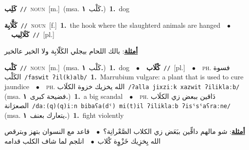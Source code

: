 \documentclass[10pt,a4paper,twoside]{article} %
\begin{document}
\begin{multicols}{2}
{\setlength\topsep{0pt}\textbf{\foreignlanguage{arabic}{كَلِب}}\ {\color{gray}\texttt{//}\color{black}}\ \textsc{noun}\ [m.]\ \color{gray}(msa. \foreignlanguage{arabic}{كَلْب}~\foreignlanguage{arabic}{\textbf{١.}})\color{black}\ \textbf{1.}~dog\ } \vspace{2mm}

{\setlength\topsep{0pt}\textbf{\foreignlanguage{arabic}{كَلَّابِة}}\ {\color{gray}\texttt{//}\color{black}}\ \textsc{noun}\ [f.]\ \textbf{1.}~the hook where the slaughterd animals are hanged\ \ $\bullet$\ \ \setlength\topsep{0pt}\textbf{\foreignlanguage{arabic}{كَلَالِيب}}\ {\color{gray}\texttt{//}\color{black}}\ [pl.]\  \begin{flushright}\color{gray}\foreignlanguage{arabic}{\textbf{\underline{\foreignlanguage{arabic}{أمثلة}}}: بالك اللحام بيجلي الكَلّابِة ولا الخير عالخير}\end{flushright}\color{black}} \vspace{2mm}

{\setlength\topsep{0pt}\textbf{\foreignlanguage{arabic}{كَلْب}}\ {\color{gray}\texttt{//}\color{black}}\ \textsc{noun}\ [m.]\ \color{gray}(msa. \foreignlanguage{arabic}{كَلْب}~\foreignlanguage{arabic}{\textbf{١.}})\color{black}\ \textbf{1.}~dog\ \ $\bullet$\ \ \setlength\topsep{0pt}\textbf{\foreignlanguage{arabic}{كْلَاب}}\ {\color{gray}\texttt{//}\color{black}}\ [pl.]\ \ $\bullet$\ \ \textsc{ph.} \color{gray} \foreignlanguage{arabic}{فسوة الكَلْب}\color{black}\ {\color{gray}\texttt{/{\sffamily faswit ʔil(k)alb}/}\color{black}}\ \textbf{1.}~Marrubium vulgare: a plant that is used to cure jaundice\ \ $\bullet$\ \ \textsc{ph.} \color{gray} \foreignlanguage{arabic}{الله يخزيك خزوة الكلَاب}\color{black}\ {\color{gray}\texttt{/{\sffamily ʔalla jixziːk xazwit ʔiliklaːb}/}\color{black}}\ \color{gray} (msa. \foreignlanguage{arabic}{فضيحة كبرى}~\foreignlanguage{arabic}{\textbf{١.}})\color{black}\ \textbf{1.}~a big scandal\ \ $\bullet$\ \ \textsc{ph.} \color{gray} \foreignlanguage{arabic}{دَاقين ببعض زي الكلَاب الصعرَانة}\color{black}\ {\color{gray}\texttt{/{\sffamily daː(q)(q)iːn bibaʕa(dˤ) mi(t)il ʔiliklaːb ʔisˤsˤaʕraːne}/}\color{black}}\ \color{gray} (msa. \foreignlanguage{arabic}{يتعارك بعنف}~\foreignlanguage{arabic}{\textbf{١.}})\color{black}\ \textbf{1.}~fight violently\  \begin{flushright}\color{gray}\foreignlanguage{arabic}{\textbf{\underline{\foreignlanguage{arabic}{أمثلة}}}: شو مالهم داقِّين ببَعَض زي الكلاب الصَّعْرانِة؟\ $\bullet$\ \  قاعد مع النسوان بتهز وبترقص الله يِخزِيك خَزْوِِة كْلاب\ $\bullet$\ \  انلجم لما شاف الكلب قدامه}\end{flushright}\color{black}} \vspace{2mm}


\end{multicols}
\end{document}
